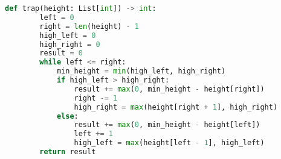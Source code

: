 
\begin{lstlisting}[language=Python, caption=Trapping Rain Water]
    def trap(height: List[int]) -> int:
        left = 0
        right = len(height) - 1
        high_left = 0
        high_right = 0
        result = 0
        while left <= right:
            min_height = min(high_left, high_right)
            if high_left > high_right:
                result += max(0, min_height - height[right])
                right -= 1
                high_right = max(height[right + 1], high_right)
            else:
                result += max(0, min_height - height[left])
                left += 1
                high_left = max(height[left - 1], high_left)
        return result

\end{lstlisting}